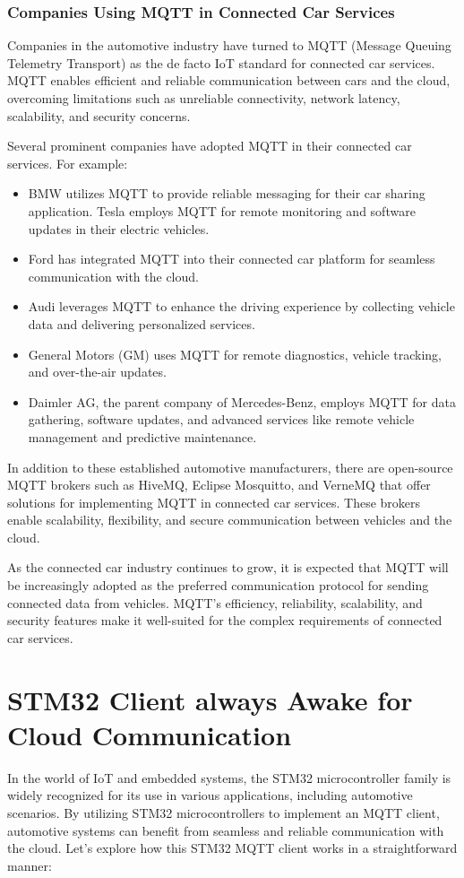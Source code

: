 \documentclass[
12pt,
oneside, 
onehalfspacing, 
nolistspacing, 
parskip, 
chapterinoneline, 
]{AASTCOMPUTER}
\begin{document}
\subsubsection{Companies Using MQTT in Connected Car Services}
Companies in the automotive industry have turned to MQTT (Message Queuing Telemetry Transport) as the de facto IoT standard for connected car services. MQTT enables efficient and reliable communication between cars and the cloud, overcoming limitations such as unreliable connectivity, network latency, scalability, and security concerns.

Several prominent companies have adopted MQTT in their connected car services. For example:

\begin{itemize}
  \item BMW utilizes MQTT to provide reliable messaging for their car sharing application. Tesla employs MQTT for remote monitoring and software updates in their electric vehicles.
  \item Ford has integrated MQTT into their connected car platform for seamless communication with the cloud.
  \item Audi leverages MQTT to enhance the driving experience by collecting vehicle data and delivering personalized services.
  \item General Motors (GM) uses MQTT for remote diagnostics, vehicle tracking, and over-the-air updates.
  \item Daimler AG, the parent company of Mercedes-Benz, employs MQTT for data gathering, software updates, and advanced services like remote vehicle management and predictive maintenance.
\end{itemize}

In addition to these established automotive manufacturers, there are open-source MQTT brokers such as HiveMQ, Eclipse Mosquitto, and VerneMQ that offer solutions for implementing MQTT in connected car services. These brokers enable scalability, flexibility, and secure communication between vehicles and the cloud.

As the connected car industry continues to grow, it is expected that MQTT will be increasingly adopted as the preferred communication protocol for sending connected data from vehicles. MQTT's efficiency, reliability, scalability, and security features make it well-suited for the complex requirements of connected car services.

\section{STM32 Client always Awake for Cloud Communication}
In the world of IoT and embedded systems, the STM32 microcontroller family is widely recognized for its use in various applications, including automotive scenarios. By utilizing STM32 microcontrollers to implement an MQTT client, automotive systems can benefit from seamless and reliable communication with the cloud. Let's explore how this STM32 MQTT client works in a straightforward manner:
\end{document}
